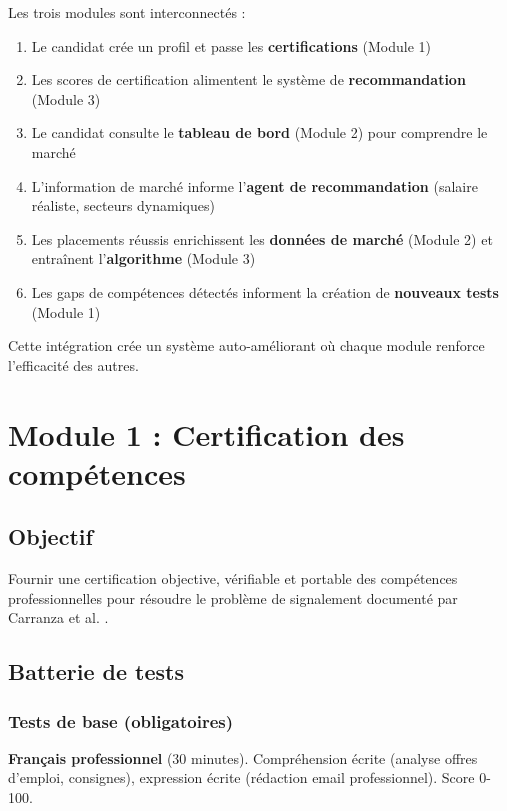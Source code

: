 \documentclass[12pt]{article}
\begin{document}
Les trois modules sont interconnectés :

\begin{enumerate}
    \item Le candidat crée un profil et passe les \textbf{certifications} (Module 1)
    \item Les scores de certification alimentent le système de \textbf{recommandation} (Module 3)
    \item Le candidat consulte le \textbf{tableau de bord} (Module 2) pour comprendre le marché
    \item L'information de marché informe l'\textbf{agent de recommandation} (salaire réaliste, secteurs dynamiques)
    \item Les placements réussis enrichissent les \textbf{données de marché} (Module 2) et entraînent l'\textbf{algorithme} (Module 3)
    \item Les gaps de compétences détectés informent la création de \textbf{nouveaux tests} (Module 1)
\end{enumerate}

Cette intégration crée un système auto-améliorant où chaque module renforce l'efficacité des autres.

\section{Module 1 : Certification des compétences}

\subsection{Objectif}

Fournir une certification objective, vérifiable et portable des compétences professionnelles pour résoudre le problème de signalement documenté par Carranza et al. \citeyearpar{carranza2022}.

\subsection{Batterie de tests}

\subsubsection{Tests de base (obligatoires)}

\textbf{Français professionnel} (30 minutes). Compréhension écrite (analyse offres d'emploi, consignes), expression écrite (rédaction email professionnel). Score 0-100.
\end{document}
